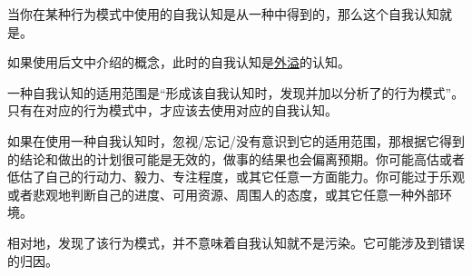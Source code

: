 当你在某种行为模式中使用的自我认知是从一种中得到的，那么这个自我认知就是。
\begin{explain}
如果使用后文中介绍的概念，此时的自我认知是\hyperref[def:外溢认知]{外溢}的认知。

一种自我认知的适用范围是“形成该自我认知时，发现并加以分析了的行为模式”。只有在对应的行为模式中，才应该去使用对应的自我认知。

如果在使用一种自我认知时，忽视/忘记/没有意识到它的适用范围，那根据它得到的结论和做出的计划很可能是无效的，做事的结果也会偏离预期。你可能高估或者低估了自己的行动力、毅力、专注程度，或其它任意一方面能力。你可能过于乐观或者悲观地判断自己的进度、可用资源、周围人的态度，或其它任意一种外部环境。

相对地，发现了该行为模式，并不意味着自我认知就不是污染。它可能涉及到错误的归因。
\end{explain}

